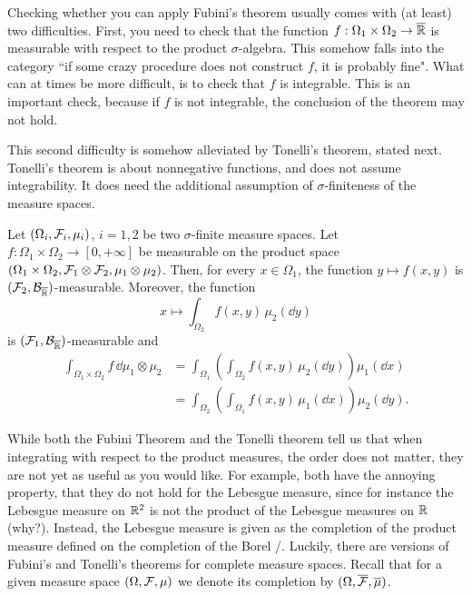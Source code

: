 Checking whether you can apply Fubini's theorem usually comes with (at least) two difficulties. First, you need to check that the function $f: \Omega_1 \times \Omega_2 \to \overline{\mathbb R}$ is measurable with respect to the product $\sigma$-algebra. This somehow falls into the category ``if some crazy procedure does not construct $f$, it is probably fine". What can at times be more difficult, is to check that $f$ is integrable. This is an important check, because if $f$ is not integrable, the conclusion of the theorem may not hold.

This second difficulty is somehow alleviated by Tonelli's theorem, stated next. Tonelli's theorem is about nonnegative functions, and does not assume integrability. It does need the additional assumption of $\sigma$-finiteness of the measure spaces.

\begin{theorem}
	Let $(\Omega_i, \mathcal F_i, \mu_i)$, $i=1,2$ be two $\sigma$-finite measure spaces. 
	Let $f : \Omega_1 \times \Omega_2 \to [0,+\infty]$ be measurable on the product space $(\Omega_1 \times \Omega_2, \mathcal F_1 \otimes \mathcal F_2, \mu_1 \otimes \mu_2)$. Then, for every $x \in \Omega_1$, the function $y \mapsto f(x, y)$ is $(\mathcal F_2,\mathcal B_{\overline{\mathbb R}})$-measurable. Moreover, the function 
	\[
	x \mapsto \int_{\Omega_2} f(x,y)\, \mu_2(\dd y)
	\]
	is $(\mathcal F_1,\mathcal B_{\overline{\mathbb R}})$-measurable and
	\[
	\begin{split}
	\int_{\Omega_1 \times \Omega_2} f\, \dd \mu_1 \otimes \mu_2 
	&= \int_{\Omega_1} \left( \int_{\Omega_2 } f(x,  y ) \,\mu_2(\dd y) \right) \mu_1(\dd x)\\
	&= \int_{\Omega_2} \left( \int_{\Omega_1} f(x, y)  \,\mu_1(\dd x) \right) \mu_2(\dd y).
	\end{split}
	\] 
\end{theorem}

While both the Fubini Theorem and the Tonelli theorem tell us that when integrating with respect to the product measures, the order does not matter, they are not yet as useful as you would like. For example, both have the annoying property, that they do not hold for the Lebesgue measure, since for instance the Lebesgue measure on $\mathbb R^2$ is not the product of the Lebesgue measures on $\mathbb R$ (why?). Instead, the Lebesgue measure is given as the completion of the product measure defined on the completion of the Borel \sigalg/. Luckily, there are versions of Fubini's and Tonelli's theorems for complete measure spaces. Recall that for a given measure space $(\Omega, \mathcal F, \mu)$ we denote its completion by $(\Omega, \overline{\mathcal F}, \overline{\mu})$.

